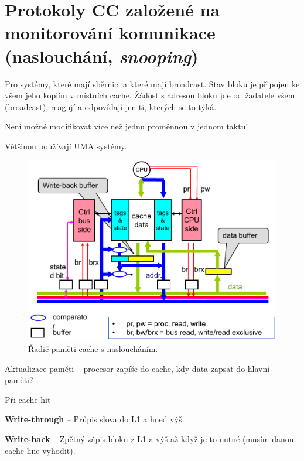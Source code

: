 
\section{Protokoly CC založené na monitorování komunikace (naslouchání, \textit{snooping})}

\begin{compactitem}
    \item Pro systémy, které mají sběrnici a které mají broadcast. Stav bloku je připojen ke všem jeho kopiím v místních cache. Žádost s adresou bloku jde od žadatele všem (broadcast), reagují a odpovídají jen ti, kterých se to týká.

    \item Není možné modifikovat více než jednu proměnnou v jednom taktu!

    \item Většinou používají UMA systémy.

    \begin{figure}[H]
        \centering
        \includegraphics[width=0.9\linewidth]{radic_cache_s_naslouchanim.pdf}
        \caption{Řadič paměti cache s nasloucháním.}
    \end{figure}

    \item Aktualizace paměti -- procesor zapíše do cache, kdy data zapsat do hlavní paměti? \begin{compactitem}
        \item Při cache hit \begin{compactitem}
            \item \textbf{Write-through} -- Průpis slova do L1 a hned výš.
            \item \textbf{Write-back} -- Zpětný zápis bloku z L1 a výš až když je to nutné (musím danou cache line vyhodit).
        \end{compactitem}


\end{compactitem}
\end{compactitem}
